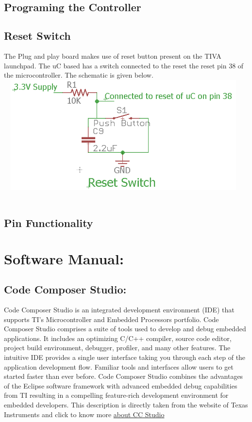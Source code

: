 \documentclass[a4paper,10pt,oneside]{article}
\begin{document}
{	\subsection{\huge \textbf{Programing the Controller}}
	\subsection{\huge \textbf{Reset Switch}}
	{The Plug and play board makes use of reset button present on the TIVA launchpad. The uC based has a switch connected to the reset the reset pin 38 of the microcontroller. The schematic is given below.}\\
	
	\hspace{3cm}
	\includegraphics[width=13cm, height=6cm]{Reset_Switch}\\\\
		
	\subsection{\huge \textbf{Pin Functionality}}
	\newpage
	\section{\Huge\textbf{Software Manual:}}
		\subsection{\huge \textbf{Code Composer Studio:}}
			{\large Code Composer Studio is an integrated development environment (IDE) that supports TI's Microcontroller and Embedded Processors portfolio. Code Composer Studio comprises a suite of tools used to develop and debug embedded applications. It includes an optimizing C/C++ compiler, source code editor, project build environment, debugger, profiler, and many other features. The intuitive IDE provides a single user interface taking you through each step of the application development flow. Familiar tools and interfaces allow users to get started faster than ever before. Code Composer Studio combines the advantages of the Eclipse software framework with advanced embedded debug capabilities from TI resulting in a compelling feature-rich development environment for embedded developers. This description is directly taken from the website of Texas Instruments and click to know more	\href{http://www.ti.com/tool/ccstudio}{about CC Studio}}}%
\end{document}
